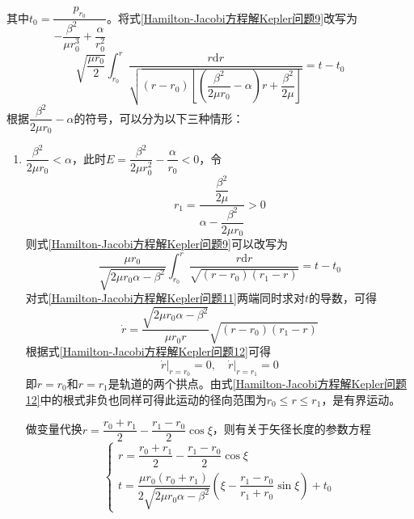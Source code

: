 其中$t_0 = \dfrac{p_{r_0}}{-\dfrac{\beta^2}{\mu r_0^3}+\dfrac{\alpha}{r_0^2}}$。将式\eqref{Hamilton-Jacobi方程解Kepler问题9}改写为
\begin{equation*}
	\sqrt{\frac{\mu r_0}{2}} \int_{r_0}^r \frac{r\mathrm{d}r}{\sqrt{(r-r_0)\left[\left(\dfrac{\beta^2}{2\mu r_0}-\alpha\right)r+\dfrac{\beta^2}{2\mu}\right]}} = t-t_0
\end{equation*}
根据$\dfrac{\beta^2}{2\mu r_0}-\alpha$的符号，可以分为以下三种情形：
\begin{enumerate}
\item $\dfrac{\beta^2}{2\mu r_0}<\alpha$，此时$E = \dfrac{\beta^2}{2\mu r_0^2}-\dfrac{\alpha}{r_0}<0$，令
\begin{equation}
	r_1 = \dfrac{\dfrac{\beta^2}{2\mu}}{\alpha-\dfrac{\beta^2}{2\mu r_0}} > 0
	\label{Hamilton-Jacobi方程解Kepler问题10}
\end{equation}
则式\eqref{Hamilton-Jacobi方程解Kepler问题9}可以改写为
\begin{equation}
	\frac{\mu r_0}{\sqrt{2\mu r_0\alpha-\beta^2}} \int_{r_0}^r \frac{r\mathrm{d}r}{\sqrt{(r-r_0)(r_1-r)}} = t-t_0
	\label{Hamilton-Jacobi方程解Kepler问题11}
\end{equation}
对式\eqref{Hamilton-Jacobi方程解Kepler问题11}两端同时求对$t$的导数，可得
\begin{equation}
	\dot{r} = \frac{\sqrt{2\mu r_0\alpha-\beta^2}}{\mu r_0r} \sqrt{(r-r_0)(r_1-r)}
	\label{Hamilton-Jacobi方程解Kepler问题12}
\end{equation}
根据式\eqref{Hamilton-Jacobi方程解Kepler问题12}可得
\begin{equation}
	\dot{r}\big|_{r=r_0} = 0,\quad \dot{r}\big|_{r=r_1} = 0
\end{equation}
即$r=r_0$和$r=r_1$是轨道的两个拱点。由式\eqref{Hamilton-Jacobi方程解Kepler问题12}中的根式非负也同样可得此运动的径向范围为$r_0\leqslant r \leqslant r_1$，是有界运动。

做变量代换$r = \dfrac{r_0+r_1}{2}-\dfrac{r_1-r_0}{2}\cos \xi$，则有关于矢径长度的参数方程
\begin{equation}
\begin{cases}
	r = \dfrac{r_0+r_1}{2}-\dfrac{r_1-r_0}{2}\cos \xi \\
	t = \dfrac{\mu r_0(r_0+r_1)}{2\sqrt{2\mu r_0\alpha-\beta^2}} \left(\xi - \dfrac{r_1-r_0}{r_1+r_0}\sin \xi\right) + t_0
\end{cases}
\label{Hamilton-Jacobi方程解Kepler问题13}
\end{equation}


\end{enumerate}
